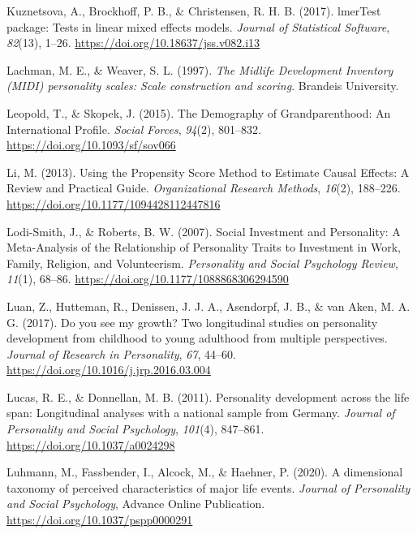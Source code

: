 \documentclass[
  english,
  man,floatsintext]{apa7}
\begin{document}
\leavevmode\hypertarget{ref-R-lmerTest}{}%
Kuznetsova, A., Brockhoff, P. B., \& Christensen, R. H. B. (2017). lmerTest package: Tests in linear mixed effects models. \emph{Journal of Statistical Software}, \emph{82}(13), 1--26. \url{https://doi.org/10.18637/jss.v082.i13}

\leavevmode\hypertarget{ref-lachmanMidlifeDevelopmentInventory1997}{}%
Lachman, M. E., \& Weaver, S. L. (1997). \emph{The Midlife Development Inventory (MIDI) personality scales: Scale construction and scoring}. Brandeis University.

\leavevmode\hypertarget{ref-leopoldDemographyGrandparenthoodInternational2015}{}%
Leopold, T., \& Skopek, J. (2015). The Demography of Grandparenthood: An International Profile. \emph{Social Forces}, \emph{94}(2), 801--832. \url{https://doi.org/10.1093/sf/sov066}

\leavevmode\hypertarget{ref-liUsingPropensityScore2013}{}%
Li, M. (2013). Using the Propensity Score Method to Estimate Causal Effects: A Review and Practical Guide. \emph{Organizational Research Methods}, \emph{16}(2), 188--226. \url{https://doi.org/10.1177/1094428112447816}

\leavevmode\hypertarget{ref-lodi-smithSocialInvestmentPersonality2007}{}%
Lodi-Smith, J., \& Roberts, B. W. (2007). Social Investment and Personality: A Meta-Analysis of the Relationship of Personality Traits to Investment in Work, Family, Religion, and Volunteerism. \emph{Personality and Social Psychology Review}, \emph{11}(1), 68--86. \url{https://doi.org/10.1177/1088868306294590}

\leavevmode\hypertarget{ref-luanYouSeeMy2017}{}%
Luan, Z., Hutteman, R., Denissen, J. J. A., Asendorpf, J. B., \& van Aken, M. A. G. (2017). Do you see my growth? Two longitudinal studies on personality development from childhood to young adulthood from multiple perspectives. \emph{Journal of Research in Personality}, \emph{67}, 44--60. \url{https://doi.org/10.1016/j.jrp.2016.03.004}

\leavevmode\hypertarget{ref-lucasPersonalityDevelopmentLife2011}{}%
Lucas, R. E., \& Donnellan, M. B. (2011). Personality development across the life span: Longitudinal analyses with a national sample from Germany. \emph{Journal of Personality and Social Psychology}, \emph{101}(4), 847--861. \url{https://doi.org/10.1037/a0024298}

\leavevmode\hypertarget{ref-luhmannDimensionalTaxonomyPerceived2020}{}%
Luhmann, M., Fassbender, I., Alcock, M., \& Haehner, P. (2020). A dimensional taxonomy of perceived characteristics of major life events. \emph{Journal of Personality and Social Psychology}, Advance Online Publication. \url{https://doi.org/10.1037/pspp0000291}
\end{document}
